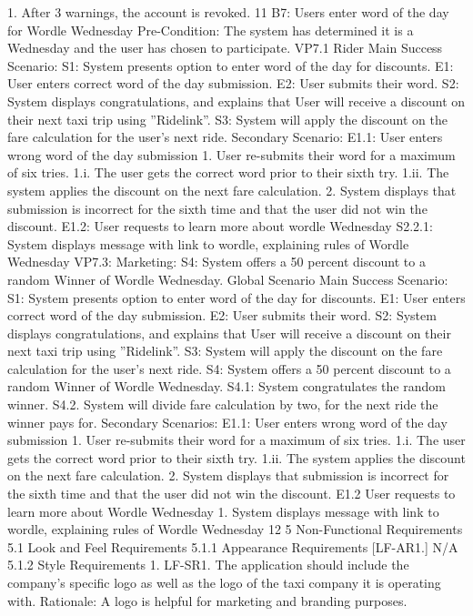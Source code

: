 1. After 3 warnings, the account is revoked.
11
B7: Users enter word of the day for Wordle Wednesday
Pre-Condition: The system has determined it is a Wednesday and the user has chosen to participate.
VP7.1 Rider
Main Success Scenario:
S1: System presents option to enter word of the day for discounts.
E1: User enters correct word of the day submission.
E2: User submits their word.
S2: System displays congratulations, and explains that User will receive a discount on their next
taxi trip using ”Ridelink”.
S3: System will apply the discount on the fare calculation for the user’s next ride.
Secondary Scenario:
E1.1: User enters wrong word of the day submission
1. User re-submits their word for a maximum of six tries.
1.i. The user gets the correct word prior to their sixth try. 1.ii. The system applies the discount
on the next fare calculation. 2. System displays that submission is incorrect for the sixth time and
that the user did not win the discount.
E1.2: User requests to learn more about wordle Wednesday
S2.2.1: System displays message with link to wordle, explaining rules of Wordle Wednesday
VP7.3: Marketing:
S4: System offers a 50 percent discount to a random Winner of Wordle Wednesday.
Global Scenario
Main Success Scenario: S1: System presents option to enter word of the day for discounts.
E1: User enters correct word of the day submission.
E2: User submits their word.
S2: System displays congratulations, and explains that User will receive a discount on their next
taxi trip using ”Ridelink”.
S3: System will apply the discount on the fare calculation for the user’s next ride.
S4: System offers a 50 percent discount to a random Winner of Wordle Wednesday.
S4.1: System congratulates the random winner.
S4.2. System will divide fare calculation by two, for the next ride the winner pays for.
Secondary Scenarios:
E1.1: User enters wrong word of the day submission
1. User re-submits their word for a maximum of six tries.
1.i. The user gets the correct word prior to their sixth try.
1.ii. The system applies the discount on the next fare calculation.
2. System displays that submission is incorrect for the sixth time and that the user did not win the
discount.
E1.2 User requests to learn more about Wordle Wednesday
1. System displays message with link to wordle, explaining rules of Wordle Wednesday
12
5 Non-Functional Requirements
5.1 Look and Feel Requirements
5.1.1 Appearance Requirements
[LF-AR1.] N/A
5.1.2 Style Requirements
1. LF-SR1. The application should include the company’s specific logo as well as the logo of the
taxi company it is operating with.
Rationale: A logo is helpful for marketing and branding purposes.
